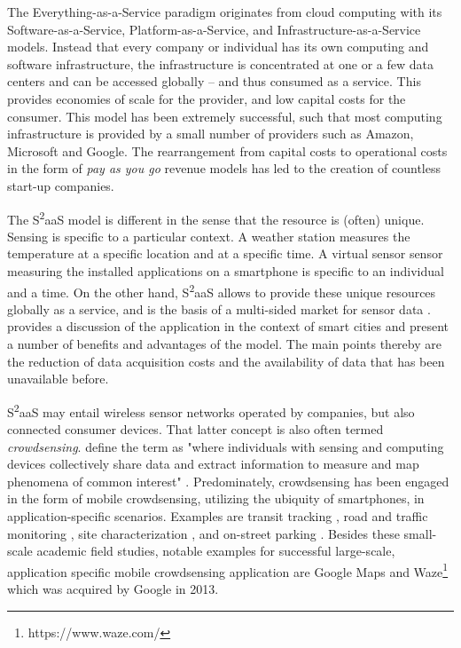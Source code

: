 The Everything-as-a-Service \parencite{10.1109/MC.2011.67} paradigm originates from cloud computing \parencite{Armbrust:2010:VCC:1721654.1721672} with its Software-as-a-Service, Platform-as-a-Service, and Infrastructure-as-a-Service models. Instead that every company or individual has its own computing and software infrastructure, the infrastructure is concentrated at one or a few data centers and can be accessed globally -- and thus consumed as a service. This provides economies of scale for the provider, and low capital costs for the consumer. This model has been extremely successful, such that most computing infrastructure is provided by a small number of providers such as Amazon, Microsoft and Google. The rearrangement from capital costs to operational costs in the form of \emph{pay as you go} revenue models has led to the creation of countless start-up companies.

The S\textsuperscript{2}aaS model is different in the sense that the resource is (often) unique. Sensing is specific to a particular context. A weather station measures the temperature at a specific location and at a specific time. A virtual sensor sensor measuring the installed applications on a smartphone is specific to an individual and a time. On the other hand, S\textsuperscript{2}aaS allows to provide these unique resources globally as a service, and is the basis of a multi-sided market for sensor data \parencite{fleisch2014business}.
\cite{Perera:2014iz} provides a discussion of the application in the context of smart cities and present a number of benefits and advantages of the model. The main points thereby are the reduction of data acquisition costs and the availability of data that has been unavailable before.

S\textsuperscript{2}aaS may entail wireless sensor networks operated by companies, but also connected consumer devices. That latter concept is also often termed \emph{crowdsensing}. \cite{ganti2011mobile} define the term as "where individuals with sensing and computing devices collectively share data and extract information to measure and map phenomena of common interest" \parencite{ganti2011mobile}. Predominately, crowdsensing has been engaged in the form of mobile crowdsensing, utilizing the ubiquity of smartphones, in application-specific scenarios. Examples are transit tracking \parencite{Thiagarajan:2010:CTT:1869983.1869993}, road and traffic monitoring \parencite{Mohan:2008:NRM:1460412.1460444}, site characterization \parencite{Chon:2012:ACP:2370216.2370288}, and on-street parking \parencite{Chen:2012:COS:2386958.2386960,6569416}. Besides these small-scale academic field studies, notable examples for successful large-scale, application specific mobile crowdsensing application are Google Maps and Waze\footnote{https://www.waze.com/} which was acquired by Google in 2013.   

